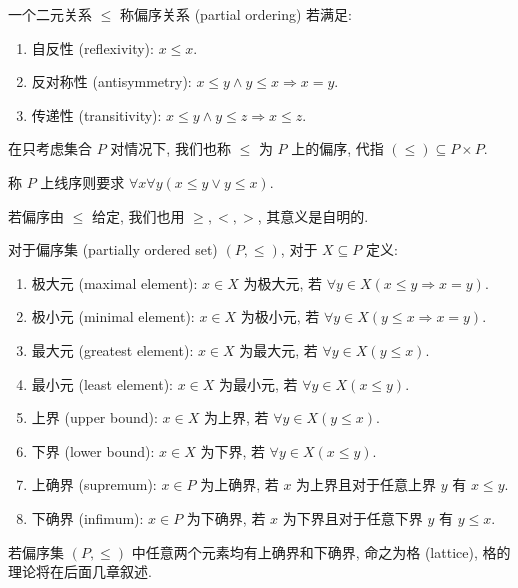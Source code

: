 \begin{definition}
    一个二元关系 \(\le\) 称偏序关系 (partial ordering) 若满足:

    \begin{enumerate}
        \item 自反性 (reflexivity): \(x \le x\).
        \item 反对称性 (antisymmetry): \(x \le y \land y \le x \Rightarrow x = y\).
        \item 传递性 (transitivity): \(x \le y \land y \le z \Rightarrow x \le z\).
    \end{enumerate}

    在只考虑集合 \(P\) 对情况下, 我们也称 \(\le\) 为 \(P\) 上的偏序, 代指 \((\le) \subseteq P \times P\).

    称 \(P\) 上线序则要求 \(\forall x \forall y (x \le y \lor y \le x)\).

    若偏序由 \(\le\) 给定, 我们也用 \(\ge, <, >\), 其意义是自明的.
\end{definition}

\begin{definition}
    对于偏序集 (partially ordered set) \((P, \le)\), 对于 \(X \subseteq P\) 定义:
    \begin{enumerate}
        \item 极大元 (maximal element): \(x \in X\) 为极大元, 若 \(\forall y \in X (x \le y \Rightarrow x = y)\).
        \item 极小元 (minimal element): \(x \in X\) 为极小元, 若 \(\forall y \in X (y \le x \Rightarrow x = y)\).
        \item 最大元 (greatest element): \(x \in X\) 为最大元, 若 \(\forall y \in X (y \le x)\).
        \item 最小元 (least element): \(x \in X\) 为最小元, 若 \(\forall y \in X (x \le y)\).
        \item 上界 (upper bound): \(x \in X\) 为上界, 若 \(\forall y \in X (y \le x)\).
        \item 下界 (lower bound): \(x \in X\) 为下界, 若 \(\forall y \in X (x \le y)\).
        \item 上确界 (supremum): \(x \in P\) 为上确界, 若 \(x\) 为上界且对于任意上界 \(y\) 有 \(x \le y\).
        \item 下确界 (infimum): \(x \in P\) 为下确界, 若 \(x\) 为下界且对于任意下界 \(y\) 有 \(y \le x\).
    \end{enumerate}
\end{definition}

\begin{definition}
    若偏序集 \((P, \le)\) 中任意两个元素均有上确界和下确界, 命之为格 (lattice), 格的理论将在后面几章叙述.
\end{definition}

